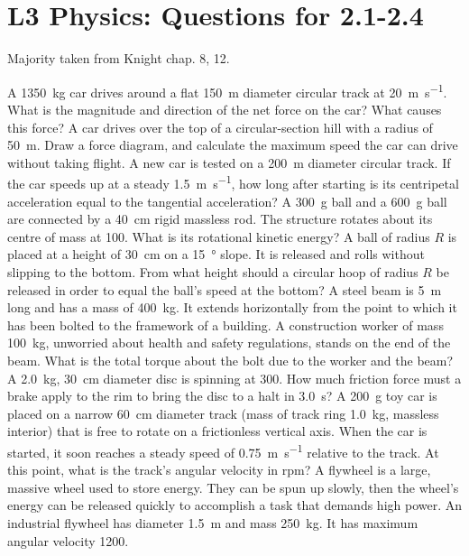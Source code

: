 \documentclass[a4paper]{exam}
\begin{document}
  \section*{L3 Physics: Questions for 2.1-2.4}
  Majority taken from Knight chap. 8, 12.
  \begin{questions}
    \question A \SI{1350}{\kilo\gram} car drives around a flat \SI{150}{\metre} diameter circular track at \SI{20}{\metre\per\second}.
              What is the magnitude and direction of the net force on the car? What causes this force?
    \question A car drives over the top of a circular-section hill with a radius of \SI{50}{\metre}. Draw a force diagram, and calculate
              the maximum speed the car can drive without taking flight.
    \question A new car is tested on a \SI{200}{\metre} diameter circular track. If the car speeds up at a steady \SI{1.5}{\metre\per\second},
              how long after starting is its centripetal acceleration equal to the tangential acceleration?
    \question A \SI{300}{\gram} ball and a \SI{600}{\gram} ball are connected by a \SI{40}{\centi\metre} rigid massless rod. The structure rotates
              about its centre of mass at \SI{100}{\rpm}. What is its rotational kinetic energy?
    \question A ball of radius $ R $ is placed at a height of \SI{30}{\centi\metre} on a \SI{15}{\degree} slope. It is released and rolls
              without slipping to the bottom. From what height should a circular hoop of radius $ R $ be released in order to equal the
              ball's speed at the bottom?
    \question A steel beam is \SI{5}{\metre} long and has a mass of \SI{400}{\kilo\gram}. It extends horizontally
              from the point to which it has been bolted to the framework of a building. A construction worker of mass \SI{100}{\kg}, unworried
              about health and safety regulations, stands on the end of the beam. What is the total torque about the bolt due to the worker
              and the beam?
    \question A \SI{2.0}{\kilo\gram}, \SI{30}{\centi\metre} diameter disc is spinning at \SI{300}{\rpm}. How much friction force must a brake
              apply to the rim to bring the disc to a halt in \SI{3.0}{\second}?
    \question A \SI{200}{\gram} toy car is placed on a narrow \SI{60}{\centi\metre} diameter track (mass of track ring \SI{1.0}{\kilo\gram},
              massless interior) that is free to rotate on a frictionless vertical axis. When the car is started, it soon reaches a steady
              speed of \SI{0.75}{\metre\per\second} relative to the track. At this point, what is the track's angular velocity in rpm?
    \question A flywheel is a large, massive wheel used to store energy. They can be spun up slowly, then the wheel's energy can be released
              quickly to accomplish a task that demands high power. An industrial flywheel has diameter \SI{1.5}{\metre} and mass \SI{250}{\kilo\gram}.
              It has maximum angular velocity \SI{1200}{\rpm}.
      \begin{parts}

\end{parts}
\end{questions}
\end{document}
